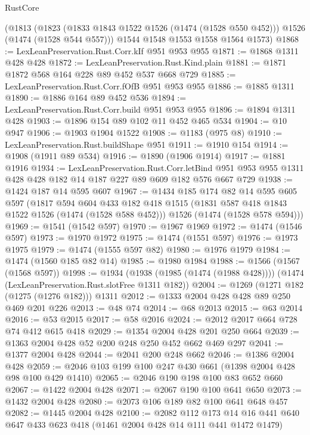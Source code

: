 \begin{lexlean}{RustCore}
\begin{coremodule}
    (@1813
      (@1823 (@1833 @1843 @1522 @1526 (@1474 (@1528 @550 @452))) @1526 (@1474 (@1528 @544 @557)))
      @1544
      @1548
      @1553
      @1558
      @1564
      @1573)
@1868 := LexLeanPreservation.Rust.Corr.kIf @951 @953 @955
@1871 := @1868 @1311 @428 @428
@1872 := LexLeanPreservation.Rust.Kind.plain
@1881 := @1871 @1872 @568 @164 @228 @89 @452 @537 @668 @729
@1885 := LexLeanPreservation.Rust.Corr.fOfB @951 @953 @955
@1886 := @1885 @1311
@1890 := @1886 @164 @89 @452 @536
@1894 := LexLeanPreservation.Rust.Corr.build @951 @953 @955
@1896 := @1894 @1311 @428
@1903 := @1896 @154 @89 @102 @11 @452 @465 @534
@1904 := @10 @947
@1906 := @1903 @1904 @1522
@1908 := @1183 (@975 @8)
@1910 := LexLeanPreservation.Rust.buildShape @951
@1911 := @1910 @154
@1914 := @1908 (@1911 @89 @534)
@1916 := @1890 (@1906 @1914)
@1917 := @1881 @1916
@1934 := LexLeanPreservation.Rust.Corr.letBind
    @951
    @953
    @955
    @1311
    @428
    @428
    @182
    @14
    @187
    @227
    @89
    @609
    @182
    @576
    @667
    @729
@1938 := @1424 @187 @14 @595 @607
@1967 := @1434
    @185
    @174
    @82
    @14
    @595
    @605
    @597
    (@1817
      @594
      @604
      @433
      @182
      @418
      @1515
      (@1831 @587 @418 @1843 @1522 @1526 (@1474 (@1528 @588 @452)))
      @1526
      (@1474 (@1528 @578 @594)))
@1969 := @1541 (@1542 @597)
@1970 := @1967 @1969
@1972 := @1474 (@1546 @597)
@1973 := @1970 @1972
@1975 := @1474 (@1551 @597)
@1976 := @1973 @1975
@1979 := @1474 (@1555 @597 @82)
@1980 := @1976 @1979
@1984 := @1474 (@1560 @185 @82 @14)
@1985 := @1980 @1984
@1988 := @1566 (@1567 (@1568 @597))
@1998 := @1934
    (@1938 (@1985 (@1474 (@1988 @428))))
    (@1474 (LexLeanPreservation.Rust.slotFree @1311 @182))
@2004 := @1269 (@1271 @182 (@1275 (@1276 @182))) @1311
@2012 := @1333 @2004 @428 @428 @89 @250 @469 @201 @226
@2013 := @48 @74
@2014 := @68 @2013
@2015 := @63 @2014
@2016 := @53 @2015
@2017 := @58 @2016
@2024 := @2012 @2017 @664 @728 @74 @412 @615 @418
@2029 := @1354 @2004 @428 @201 @250 @664
@2039 := @1363 @2004 @428 @52 @200 @248 @250 @452 @662 @469 @297
@2041 := @1377 @2004 @428
@2044 := @2041 @200 @248 @662
@2046 := @1386 @2004 @428
@2059 := @2046 @103 @199 @100 @247 @430 @661 (@1398 @2004 @428 @98 @100 @429 @1410)
@2065 := @2046 @190 @198 @100 @83 @652 @660
@2067 := @1422 @2004 @428
@2071 := @2067 @190 @100 @641 @650
@2073 := @1432 @2004 @428
@2080 := @2073 @106 @189 @82 @100 @641 @648 @457
@2082 := @1445 @2004 @428
@2100 := @2082
    @112
    @173
    @14
    @16
    @441
    @640
    @647
    @433
    @623
    @418
    (@1461 @2004 @428 @14 @111 @441 @1472 @1479)

\end{coremodule}
\end{lexlean}
